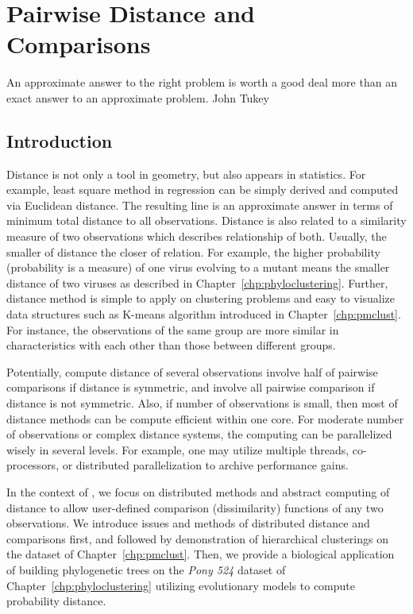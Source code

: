 \chapter{Pairwise Distance and Comparisons}
\label{chp:pairwise}

\inspire%
{An approximate answer to the right problem is worth a good deal more than
an exact answer to an approximate problem.}%
{John Tukey}


\section{Introduction}

Distance is not only a tool in geometry, but also appears in statistics. For
example, least square method in regression can be simply derived and computed
via Euclidean distance. The resulting line is an approximate answer
in terms of minimum total distance to all observations. Distance is also
related to a similarity measure of two observations which describes
relationship of both.
Usually, the smaller of distance the closer of relation. For example, the
higher probability (probability is a measure) of
one virus evolving to a mutant means the smaller distance of two viruses
as described in Chapter~\ref{chp:phyloclustering}.
Further, distance method is simple to apply on clustering problems
and easy to visualize data structures such as K-means algorithm
introduced in Chapter~\ref{chp:pmclust}. For instance,
the observations of the same group are more similar in characteristics with
each other than those between different groups.

Potentially, compute distance of several observations involve half of
pairwise comparisons if distance is symmetric, and involve all pairwise
comparison if distance is not symmetric. Also, if number of observations
is small, then most of distance methods can be compute efficient within
one core. For moderate number of observations or complex distance systems,
the computing can be parallelized wisely in several levels. For example,
one may utilize multiple threads, co-processors, or distributed parallelization
to archive performance gains.

In the context of \pbdR,
we focus on distributed methods and abstract
computing of distance to allow user-defined comparison (dissimilarity)
functions of any two observations.
We introduce issues and methods of distributed distance and comparisons first,
and followed by demonstration of hierarchical clusterings on the
dataset of Chapter~\ref{chp:pmclust}. Then, we provide a biological
application of building phylogenetic trees on the
{\it Pony 524} dataset
of Chapter~\ref{chp:phyloclustering} utilizing
evolutionary models to compute probability distance.



